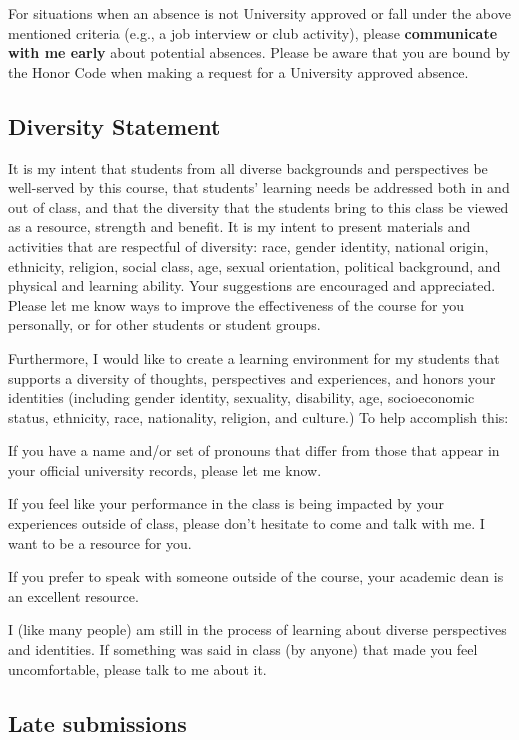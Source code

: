 \documentclass[11pt,]{article}
\begin{document}
For situations when an absence is not University approved or fall under
the above mentioned criteria (e.g., a job interview or club activity),
please \textbf{communicate with me early} about potential absences.
Please be aware that you are bound by the Honor Code when making a
request for a University approved absence.

\hypertarget{diversity-statement}{%
\subsection{Diversity Statement}\label{diversity-statement}}

It is my intent that students from all diverse backgrounds and
perspectives be well-served by this course, that students' learning
needs be addressed both in and out of class, and that the diversity that
the students bring to this class be viewed as a resource, strength and
benefit. It is my intent to present materials and activities that are
respectful of diversity: race, gender identity, national origin,
ethnicity, religion, social class, age, sexual orientation, political
background, and physical and learning ability. Your suggestions are
encouraged and appreciated. Please let me know ways to improve the
effectiveness of the course for you personally, or for other students or
student groups.

Furthermore, I would like to create a learning environment for my
students that supports a diversity of thoughts, perspectives and
experiences, and honors your identities (including gender identity,
sexuality, disability, age, socioeconomic status, ethnicity, race,
nationality, religion, and culture.) To help accomplish this:

If you have a name and/or set of pronouns that differ from those that
appear in your official university records, please let me know.

If you feel like your performance in the class is being impacted by your
experiences outside of class, please don't hesitate to come and talk
with me. I want to be a resource for you.

If you prefer to speak with someone outside of the course, your academic
dean is an excellent resource.

I (like many people) am still in the process of learning about diverse
perspectives and identities. If something was said in class (by anyone)
that made you feel uncomfortable, please talk to me about it.

\hypertarget{late-submissions}{%
\subsection{Late submissions}\label{late-submissions}}
\end{document}
